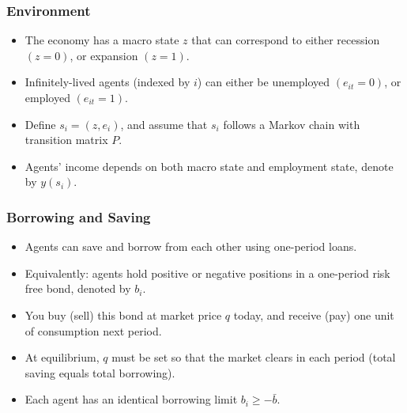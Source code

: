 \documentclass[handout]{beamer}
\newcommand{\E}{\mathbb{E}}
\theoremstyle{definition}
\begin{document}
\begin{frame}
  \frametitle{Environment}
  \begin{itemize}[<+->]
  \item The economy has a macro state $z$ that can correspond to either recession $(z = 0)$, or expansion $(z = 1)$.
  \item Infinitely-lived agents (indexed by $i$) can either be unemployed $(e_{it} = 0)$, or employed $(e_{it} = 1)$.
  \item Define $s_i = (z, e_i)$, and assume that $s_i$ follows a Markov chain with transition matrix $P$.
  \item Agents' income depends on both macro state and employment state, denote by $y(s_i)$.
  \end{itemize}
\end{frame}

\begin{frame}
  \frametitle{Borrowing and Saving}
  \begin{itemize}[<+->]
  \item Agents can save and borrow from each other using one-period loans.
  \item Equivalently: agents hold positive or negative positions in a one-period risk free bond, denoted by $b_i$.
  \item You buy (sell) this bond at market price $q$ today, and receive (pay) one unit of consumption next period.
  \item At equilibrium, $q$ must be set so that the market clears in each period (total saving equals total borrowing).
  \item Each agent has an identical borrowing limit $b_i \ge -\bar{b}$.
  \end{itemize}
\end{frame}

\end{document}
